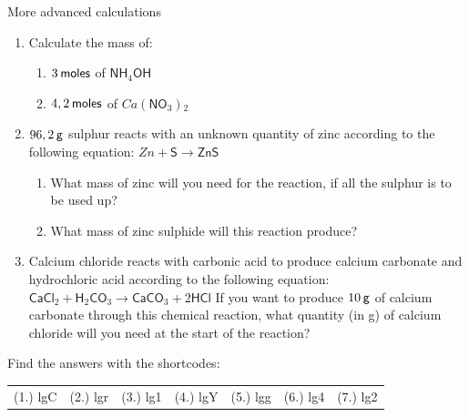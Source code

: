\begin{exercises}{  More advanced calculations
      }
\begin{enumerate}[noitemsep, label=\textbf{\arabic*}. ]
\begin{enumerate}[noitemsep, label=\textbf{\alph*}. ]
\end{enumerate}
                \label{m38717*uid61}\item Calculate the mass of:
\label{m38717*id280072}\begin{enumerate}[noitemsep, label=\textbf{\alph*}. ] 
            \label{m38717*uid62}\item $3\phantom{\rule{2pt}{0ex}}\mathsf{moles}$ of $\mathsf{NH}{}_{4}\mathsf{OH}$
\label{m38717*uid63}\item $4,2\phantom{\rule{2pt}{0ex}}\mathsf{moles}$ of $Ca\left(\mathsf{NO}{}_{3}\right){}_{2}$\end{enumerate}
                \label{m38717*uid64}\item $96,2\phantom{\rule{2pt}{0ex}}\mathsf{g}$ sulphur reacts with an unknown quantity of zinc according to the following equation:
$Zn+\mathsf{S}\to \mathsf{ZnS}$\label{m38717*id280179}\begin{enumerate}[noitemsep, label=\textbf{\alph*}. ] 
            \label{m38717*uid65}\item What mass of zinc will you need for the reaction, if all the sulphur is to be used up?
\label{m38717*uid66}\item What mass of zinc sulphide will this reaction produce?
\end{enumerate}
                \label{m38717*uid67}\item Calcium chloride reacts with carbonic acid to produce calcium carbonate and hydrochloric acid according to the following equation:
${\mathsf{CaCl}}_{2}+{\mathsf{H}}_{2}{\mathsf{CO}}_{3}\to {\mathsf{CaCO}}_{3}+2\mathsf{HCl}$
If you want to produce $10\phantom{\rule{2pt}{0ex}}\mathsf{g}$ of calcium carbonate through this chemical reaction, what quantity (in g) of calcium chloride will you need at the start of the reaction?\newline
\end{enumerate}
  \label{m38717**end}
\par {} Find the answers with the shortcodes:
 \par \begin{tabular}[h]{cccccc}
 (1.) lgC  &  (2.) lgr  &  (3.) lg1  &  (4.) lgY  &  (5.) lgg  &  (6.) lg4  &  (7.) lg2  & \end{tabular}
\end{exercises}
